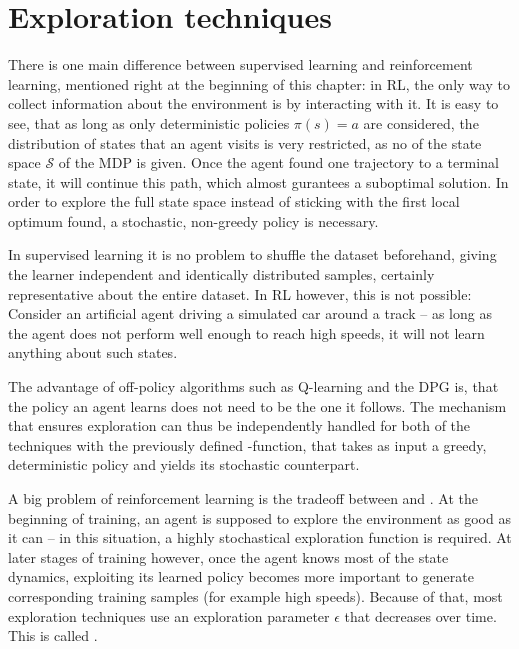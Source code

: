 \section{Exploration techniques}

\label{sec:exploration}

There is one main difference between supervised learning and reinforcement learning, mentioned right at the beginning of this chapter: in RL, the only way to collect information about the environment is by interacting with it. It is easy to see, that as long as only deterministic policies $\pi(s) = a$ are considered, the distribution of states that an agent visits is very restricted, as no  of the state space $\mathcal{S}$ of the MDP is given. Once the agent found one trajectory to a terminal state, it will continue  this path, which almost gurantees a suboptimal solution. In order to explore the full state space instead of sticking with the first local optimum found, a stochastic, non-greedy policy is necessary.

In supervised learning it is no problem to shuffle the dataset beforehand, giving the learner independent and identically distributed samples, certainly representative about the entire dataset. In RL however, this is not possible: Consider an artificial agent driving a simulated car around a track -- as long as the agent does not perform well enough to reach high speeds, it will not learn anything about such states. 

The advantage of off-policy algorithms such as Q-learning and the DPG is, that the policy an agent learns does not need to be the one it follows. The mechanism that ensures exploration can thus be independently handled for both of the techniques with the previously defined -function, that takes as input a greedy, deterministic policy and yields its stochastic counterpart.

A big problem of reinforcement learning is the tradeoff between  and . At the beginning of training, an agent is supposed to explore the environment as good as it can -- in this situation, a highly stochastical exploration function is required. At later stages of training however, once the agent knows most of the state dynamics, exploiting its learned policy becomes more important to generate corresponding training samples (for example high speeds). Because of that, most exploration techniques use an exploration parameter $\epsilon$ that decreases over time. This is called .


